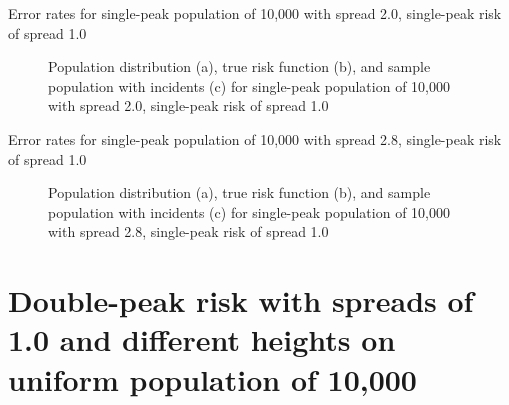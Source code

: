 
\begin{table}[H]
    
    \caption[]{Error rates for single-peak population of 10,000 with \gls{spread} 2.0, single-peak risk of \gls{spread} 1.0}
    \label{tab:mean_error_rates:p2.0_100_1.0_1h}
\end{table}

\begin{figure}[H]
    
    \caption[]{Population distribution (a), true risk function (b), and sample population with incidents (c) for single-peak population of 10,000 with \gls{spread} 2.0, single-peak risk of \gls{spread} 1.0}
    \label{fig:distributions:p2.0_100_1.0_1h}    
\end{figure}


\begin{table}[H]
    
    \caption[]{Error rates for single-peak population of 10,000 with \gls{spread} 2.8, single-peak risk of \gls{spread} 1.0}
    \label{tab:mean_error_rates:p2.8_100_1.0_1h}
\end{table}

\begin{figure}[H]
    
    \caption[]{Population distribution (a), true risk function (b), and sample population with incidents (c) for single-peak population of 10,000 with \gls{spread} 2.8, single-peak risk of \gls{spread} 1.0}
    \label{fig:distributions:p2.8_100_1.0_1h}    
\end{figure}





\section{Double-peak risk with spreads of 1.0 and different heights on uniform population of 10,000}
\label{sec:app:results_unif_100_1_2h_X}


